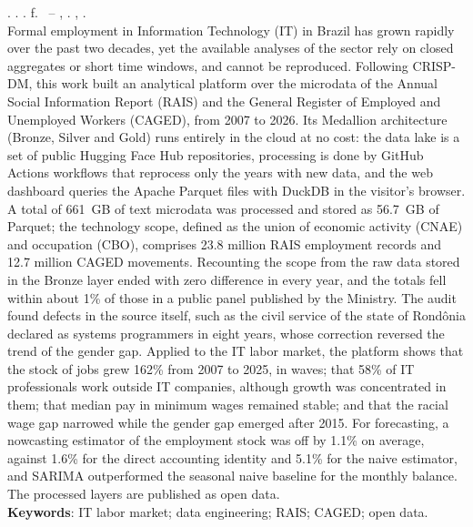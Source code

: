 
\begin{resumo}[ABSTRACT]
\begin{SingleSpacing}

\imprimirautorcitacao. \imprimirtitleabstract. \imprimirdata. \pageref{LastPage} f. \imprimirprojeto\ -- \imprimirprograma, \imprimirinstituicao. \imprimirlocal, \imprimirdata.\\

Formal employment in Information Technology (IT) in Brazil has grown rapidly over the past two decades, yet the available analyses of the sector rely on closed aggregates or short time windows, and cannot be reproduced. Following CRISP-DM, this work built an analytical platform over the microdata of the Annual Social Information Report (RAIS) and the General Register of Employed and Unemployed Workers (CAGED), from 2007 to 2026. Its Medallion architecture (Bronze, Silver and Gold) runs entirely in the cloud at no cost: the data lake is a set of public Hugging Face Hub repositories, processing is done by GitHub Actions workflows that reprocess only the years with new data, and the web dashboard queries the Apache Parquet files with DuckDB in the visitor's browser. A total of 661~GB of text microdata was processed and stored as 56.7~GB of Parquet; the technology scope, defined as the union of economic activity (CNAE) and occupation (CBO), comprises 23.8 million RAIS employment records and 12.7 million CAGED movements. Recounting the scope from the raw data stored in the Bronze layer ended with zero difference in every year, and the totals fell within about 1\% of those in a public panel published by the Ministry. The audit found defects in the source itself, such as the civil service of the state of Rondônia declared as systems programmers in eight years, whose correction reversed the trend of the gender gap. Applied to the IT labor market, the platform shows that the stock of jobs grew 162\% from 2007 to 2025, in waves; that 58\% of IT professionals work outside IT companies, although growth was concentrated in them; that median pay in minimum wages remained stable; and that the racial wage gap narrowed while the gender gap emerged after 2015. For forecasting, a nowcasting estimator of the employment stock was off by 1.1\% on average, against 1.6\% for the direct accounting identity and 5.1\% for the naive estimator, and SARIMA outperformed the seasonal naive baseline for the monthly balance. The processed layers are published as open data.\\

\textbf{Keywords}: IT labor market; data engineering; RAIS; CAGED; open data.

\end{SingleSpacing}
\end{resumo}
